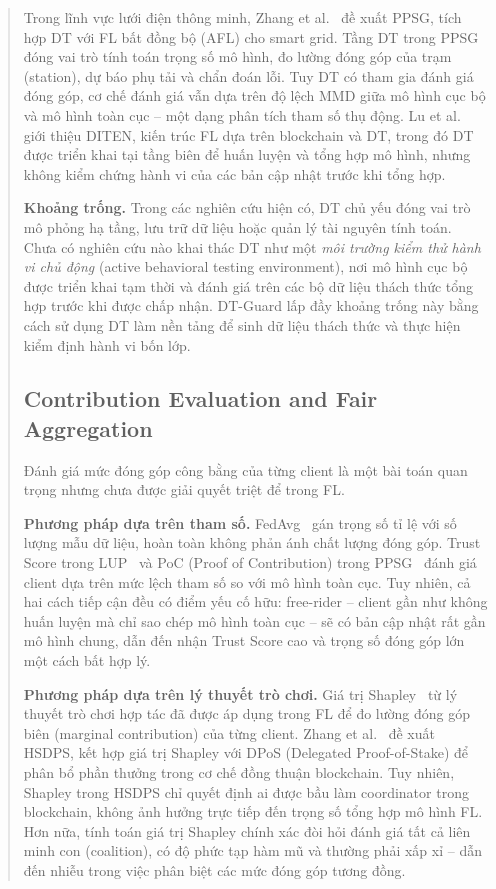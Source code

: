 \documentclass[runningheads]{llncs}
\begin{document}
\begin{abstract}
Trong lĩnh vực lưới điện thông minh, Zhang et al.~\cite{zhang2025ppsg} đề xuất PPSG, tích hợp DT với FL bất đồng bộ (AFL) cho smart grid. Tầng DT trong PPSG đóng vai trò tính toán trọng số mô hình, đo lường đóng góp của trạm (station), dự báo phụ tải và chẩn đoán lỗi. Tuy DT có tham gia đánh giá đóng góp, cơ chế đánh giá vẫn dựa trên độ lệch MMD giữa mô hình cục bộ và mô hình toàn cục -- một dạng phân tích tham số thụ động. Lu et al.~\cite{lu2020diten} giới thiệu DITEN, kiến trúc FL dựa trên blockchain và DT, trong đó DT được triển khai tại tầng biên để huấn luyện và tổng hợp mô hình, nhưng không kiểm chứng hành vi của các bản cập nhật trước khi tổng hợp.

\textbf{Khoảng trống.} Trong các nghiên cứu hiện có, DT chủ yếu đóng vai trò mô phỏng hạ tầng, lưu trữ dữ liệu hoặc quản lý tài nguyên tính toán. Chưa có nghiên cứu nào khai thác DT như một \emph{môi trường kiểm thử hành vi chủ động} (active behavioral testing environment), nơi mô hình cục bộ được triển khai tạm thời và đánh giá trên các bộ dữ liệu thách thức tổng hợp trước khi được chấp nhận. DT-Guard lấp đầy khoảng trống này bằng cách sử dụng DT làm nền tảng để sinh dữ liệu thách thức và thực hiện kiểm định hành vi bốn lớp.

\subsection{Contribution Evaluation and Fair Aggregation}

Đánh giá mức đóng góp công bằng của từng client là một bài toán quan trọng nhưng chưa được giải quyết triệt để trong FL.

\textbf{Phương pháp dựa trên tham số.} FedAvg~\cite{mcmahan2016communication} gán trọng số tỉ lệ với số lượng mẫu dữ liệu, hoàn toàn không phản ánh chất lượng đóng góp. Trust Score trong LUP~\cite{issa2025dtbfl} và PoC (Proof of Contribution) trong PPSG~\cite{zhang2025ppsg} đánh giá client dựa trên mức lệch tham số so với mô hình toàn cục. Tuy nhiên, cả hai cách tiếp cận đều có điểm yếu cố hữu: free-rider -- client gần như không huấn luyện mà chỉ sao chép mô hình toàn cục -- sẽ có bản cập nhật rất gần mô hình chung, dẫn đến nhận Trust Score cao và trọng số đóng góp lớn một cách bất hợp lý.

\textbf{Phương pháp dựa trên lý thuyết trò chơi.} Giá trị Shapley~\cite{shapley1953value} từ lý thuyết trò chơi hợp tác đã được áp dụng trong FL để đo lường đóng góp biên (marginal contribution) của từng client. Zhang et al.~\cite{zhang2025bcsm} đề xuất HSDPS, kết hợp giá trị Shapley với DPoS (Delegated Proof-of-Stake) để phân bổ phần thưởng trong cơ chế đồng thuận blockchain. Tuy nhiên, Shapley trong HSDPS chỉ quyết định ai được bầu làm coordinator trong blockchain, không ảnh hưởng trực tiếp đến trọng số tổng hợp mô hình FL. Hơn nữa, tính toán giá trị Shapley chính xác đòi hỏi đánh giá tất cả liên minh con (coalition), có độ phức tạp hàm mũ và thường phải xấp xỉ -- dẫn đến nhiễu trong việc phân biệt các mức đóng góp tương đồng.


\end{abstract}
\end{document}
